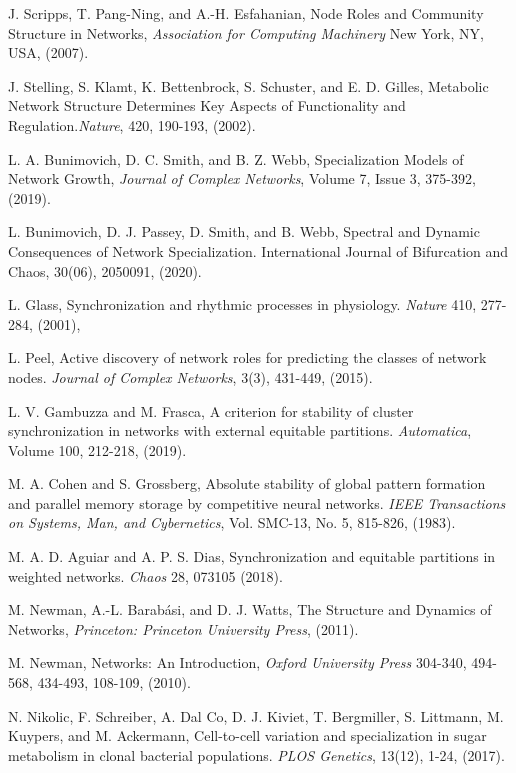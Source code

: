 \documentclass[12pt]{thesis}
\begin{document}
\begin{thebibliography}{99}
     J. Scripps, T. Pang-Ning, and A.-H. Esfahanian, Node Roles and Community Structure in Networks, \textit{Association for Computing Machinery} New York, NY, USA, (2007).
    
     J. Stelling, S. Klamt, K. Bettenbrock, S. Schuster, and E. D. Gilles, Metabolic Network Structure Determines Key Aspects of Functionality and Regulation.\textit{Nature}, {420, 190-193}, (2002).
    
     L. A. Bunimovich, D. C. Smith, and B. Z. Webb, Specialization Models of Network Growth, \textit{Journal of Complex Networks}, Volume 7, Issue 3, {375-392}, (2019).
    
     L. Bunimovich, D. J. Passey, D. Smith, and B. Webb, Spectral and Dynamic Consequences of Network Specialization. International Journal of Bifurcation and Chaos, 30(06), 2050091, (2020).
    
     L. Glass, Synchronization and rhythmic processes in physiology. \textit{Nature} {410, 277-284, (2001),}
    
     L. Peel, Active discovery of network roles for predicting the classes of network nodes. \textit{Journal of Complex Networks}, {3(3), 431-449}, (2015).

     L. V. Gambuzza and M. Frasca, A criterion for stability of cluster synchronization in networks with external equitable partitions. \textit{Automatica}, Volume 100, {212-218}, (2019).
    
     M. A. Cohen and S. Grossberg, Absolute stability of global pattern formation and parallel memory storage by competitive neural networks. \textit{IEEE Transactions on Systems, Man, and Cybernetics}, Vol. SMC-13, No. 5, {815-826}, (1983).

     M. A. D. Aguiar and A. P. S. Dias, Synchronization and equitable partitions in weighted networks. \textit{Chaos} 28, {073105} (2018).

     M. Newman, A.-L. Barabási, and D. J. Watts, The Structure and Dynamics of Networks, \textit{Princeton: Princeton University Press}, (2011). %

     M. Newman, Networks: An Introduction, \textit{Oxford University Press} {304-340, 494-568, 434-493, 108-109}, (2010).

     N. Nikolic, F. Schreiber, A. Dal Co, D. J. Kiviet, T. Bergmiller, S. Littmann, M. Kuypers, and M. Ackermann, Cell-to-cell variation and specialization in sugar metabolism in clonal bacterial populations. \textit{PLOS Genetics}, 13(12), 1-24, (2017).
    

\end{thebibliography}
\end{document}
